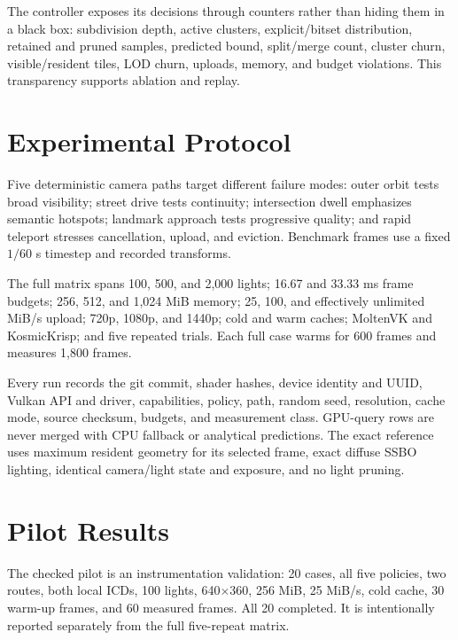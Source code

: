 \documentclass[10pt,twocolumn]{article}
\begin{document}
The controller exposes its decisions through counters rather than hiding them in a black box:
subdivision depth, active clusters, explicit/bitset distribution, retained and pruned samples,
predicted bound, split/merge count, cluster churn, visible/resident tiles, LOD churn, uploads, memory,
and budget violations. This transparency supports ablation and replay.

\section{Experimental Protocol}
Five deterministic camera paths target different failure modes: outer orbit tests broad visibility;
street drive tests continuity; intersection dwell emphasizes semantic hotspots; landmark approach
tests progressive quality; and rapid teleport stresses cancellation, upload, and eviction. Benchmark
frames use a fixed $1/60$ s timestep and recorded transforms.

The full matrix spans 100, 500, and 2,000 lights; 16.67 and 33.33 ms frame budgets; 256, 512, and
1,024 MiB memory; 25, 100, and effectively unlimited MiB/s upload; 720p, 1080p, and 1440p; cold and
warm caches; MoltenVK and KosmicKrisp; and five repeated trials. Each full case warms for 600 frames
and measures 1,800 frames.

Every run records the git commit, shader hashes, device identity and UUID, Vulkan API and driver,
capabilities, policy, path, random seed, resolution, cache mode, source checksum, budgets, and
measurement class. GPU-query rows are never merged with CPU fallback or analytical predictions.
The exact reference uses maximum resident geometry for its selected frame, exact diffuse SSBO
lighting, identical camera/light state and exposure, and no light pruning.

\clearpage
\section{Pilot Results}
The checked pilot is an instrumentation validation: 20 cases, all five policies, two routes, both
local ICDs, 100 lights, 640$\times$360, 256 MiB, 25 MiB/s, cold cache, 30 warm-up frames, and 60
measured frames. All 20 completed. It is intentionally reported separately from the full
five-repeat matrix.
\end{document}
